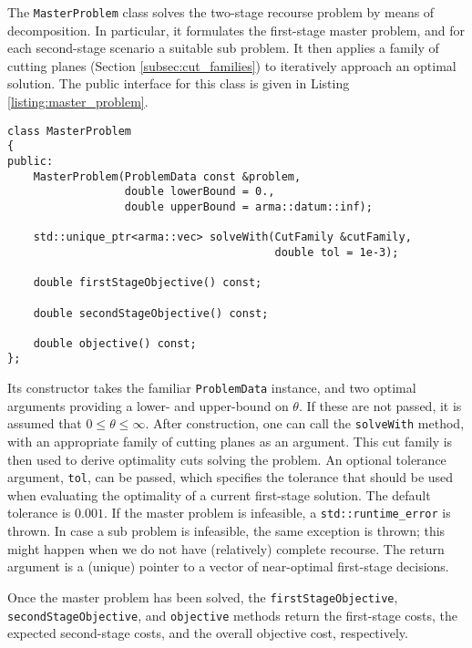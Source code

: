 \documentclass[12pt, english]{article}
\begin{document}
The \texttt{MasterProblem} class solves the two-stage recourse problem by means of decomposition. In particular, it formulates the first-stage master problem, and for each second-stage scenario a suitable sub problem. It then applies a family of cutting planes (Section \ref{subsec:cut_families}) to iteratively approach an optimal solution. The public interface for this class is given in Listing \ref{listing:master_problem}.
\begin{lstlisting}[caption={Public interface of the \texttt{MasterProblem} class.}, 
                   label={listing:master_problem}]
class MasterProblem
{
public:
	MasterProblem(ProblemData const &problem,
				  double lowerBound = 0.,
				  double upperBound = arma::datum::inf);
		
	std::unique_ptr<arma::vec> solveWith(CutFamily &cutFamily,
	                                     double tol = 1e-3);
	
	double firstStageObjective() const;
	
	double secondStageObjective() const;
	
	double objective() const;
};
\end{lstlisting}
Its constructor takes the familiar \texttt{ProblemData} instance, and two optimal arguments providing a lower- and upper-bound on $\theta$. If these are not passed, it is assumed that $0 \le \theta \le \infty$. After construction, one can call the \texttt{solveWith} method, with an appropriate family of cutting planes as an argument. This cut family is then used to derive optimality cuts solving the problem. An optional tolerance argument, \texttt{tol}, can be passed, which specifies the tolerance that should be used when evaluating the optimality of a current first-stage solution. The default tolerance is $0.001$. If the master problem is infeasible, a \texttt{std::runtime\_error} is thrown. In case a sub problem is infeasible, the same exception is thrown; this might happen when we do not have (relatively) complete recourse. The return argument is a (unique) pointer to a vector of near-optimal first-stage decisions.

Once the master problem has been solved, the \texttt{firstStageObjective}, \texttt{secondStageObjective}, and \texttt{objective} methods return the first-stage costs, the expected second-stage costs, and the overall objective cost, respectively.
\end{document}
